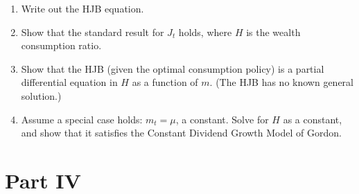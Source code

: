 \documentclass{article}
\begin{document}
\begin{itemize}
\begin{enumerate}

\item Write out the HJB equation.

\item Show that the standard result for $J_t$ holds, where $H$ is the wealth consumption ratio.

\item Show that the HJB (given the optimal consumption policy) is a partial differential equation in $H$ as a function of $m$. (The HJB has no known general solution.)

\item Assume a special case holds: $m_t = \mu$, a constant. Solve for $H$ as a constant, and show that it satisfies the Constant Dividend Growth Model of Gordon.

\end{enumerate}

\end{itemize}

\pagebreak

\section{Part IV}
\end{document}
